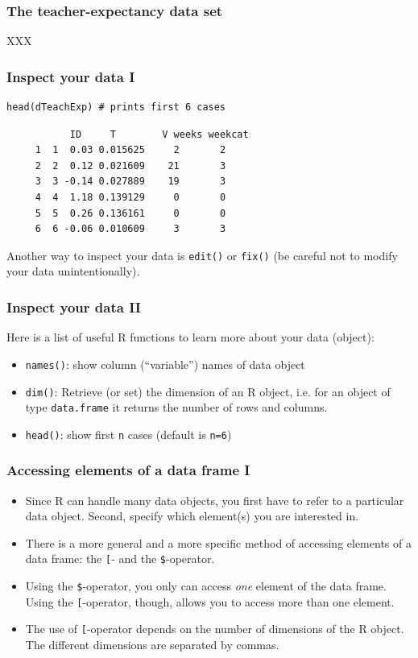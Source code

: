 \documentclass[bigger]{beamer}
\begin{document}
\begin{frame}
\frametitle{The teacher-expectancy data set}
\label{sec-3-1-3}

    XXX
\end{frame}
\begin{frame}[fragile]
\frametitle{Inspect your data I}
\label{sec-3-1-4}


\lstset{language=R}
\begin{lstlisting}
head(dTeachExp) # prints first 6 cases
\end{lstlisting}

\begin{verbatim}
           ID     T        V weeks weekcat
     1  1  0.03 0.015625     2       2
     2  2  0.12 0.021609    21       3
     3  3 -0.14 0.027889    19       3
     4  4  1.18 0.139129     0       0
     5  5  0.26 0.136161     0       0
     6  6 -0.06 0.010609     3       3
\end{verbatim}

    Another way to inspect your data is \texttt{edit()} or \texttt{fix()} (be careful not to
    modify your data unintentionally). 
\end{frame}
\begin{frame}
\frametitle{Inspect your data II}
\label{sec-3-1-5}

    Here is a list of useful R functions to learn more about your data (object):
\begin{itemize}
\item \texttt{names()}: show column (\enquote{variable}) names of data object
\item \texttt{dim()}: Retrieve (or set) the dimension of an R object, i.e. for an
      object of type \texttt{data.frame} it returns the number of rows and columns.
\item \texttt{head()}: show first \texttt{n} cases (default is \texttt{n=6})
\end{itemize}
\end{frame}
\begin{frame}
\frametitle{Accessing elements of a data frame I}
\label{sec-3-1-6}

\begin{itemize}
\item Since R can handle many data objects, you first have to refer to a
      particular data object. Second, specify which element(s) you are interested
      in.
\item There is a more general and a more specific method of accessing elements
      of a data frame: the \texttt{[}- and the \texttt{\$}-operator.
\item Using the \texttt{\$}-operator, you only can access \emph{one} element of the data
      frame. Using the \texttt{[}-operator, though, allows you to access more than one
      element.
\item The use of \texttt{[}-operator depends on the number of dimensions of the R
      object. The different dimensions are separated by commas.
\end{itemize}
\end{frame}
\end{document}
